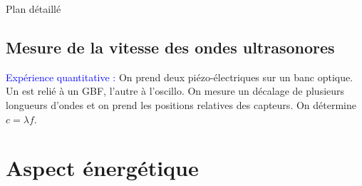 \begin{reportBlock}{Plan détaillé}
  \subsection{Mesure de la vitesse des ondes ultrasonores}
  \textcolor{blue}{Expérience quantitative :} On prend deux piézo-électriques sur un banc optique. Un est relié à un GBF, l'autre à l'oscillo. On mesure un décalage de plusieurs longueurs d'ondes et on prend les positions relatives des capteurs. On détermine $c=\lambda f$.
  
  \section{Aspect énergétique}
  


\end{reportBlock}